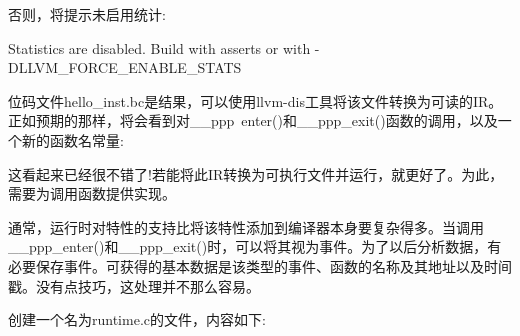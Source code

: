 否则，将提示未启用统计:

\begin{shell}
Statistics are disabled. Build with asserts or with
-DLLVM_FORCE_ENABLE_STATS
\end{shell}

位码文件hello\_inst.bc是结果，可以使用llvm-dis工具将该文件转换为可读的IR。正如预期的那样，将会看到对\_\_ppp\ enter()和\_\_ppp\_exit()函数的调用，以及一个新的函数名常量:


这看起来已经很不错了!若能将此IR转换为可执行文件并运行，就更好了。为此，需要为调用函数提供实现。

通常，运行时对特性的支持比将该特性添加到编译器本身要复杂得多。当调用\_\_ppp\_enter()和\_\_ppp\_exit()时，可以将其视为事件。为了以后分析数据，有必要保存事件。可获得的基本数据是该类型的事件、函数的名称及其地址以及时间戳。没有点技巧，这处理并不那么容易。

创建一个名为runtime.c的文件，内容如下:

